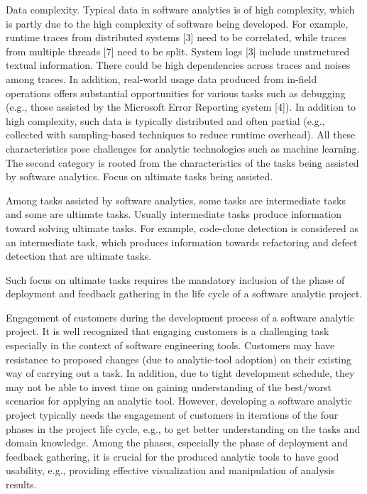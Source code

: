 Data complexity. 
Typical data in software analytics is of high complexity, which is partly due to the high complexity of software being developed. For example, runtime traces from distributed systems [3] need to be correlated, while traces from multiple threads [7] need to be split. System logs [3] include unstructured textual information. There could be high dependencies across traces and noises among traces. In addition, real-world usage data produced from in-field operations offers substantial opportunities for various tasks such as debugging (e.g., those assisted by the Microsoft Error Reporting system [4]). In addition to high complexity, such data is typically distributed and often partial (e.g., collected with sampling-based techniques to reduce runtime overhead). All these characteristics pose challenges for analytic technologies such as machine learning. The second category is rooted from the characteristics of the
tasks being assisted by software analytics. Focus on ultimate tasks being assisted. 

Among tasks assisted by software analytics, some tasks are intermediate tasks and some are ultimate tasks. Usually intermediate tasks produce information toward solving ultimate tasks. For example, code-clone detection is considered as an intermediate task, which produces information towards refactoring and defect detection that are ultimate tasks.

Such focus on ultimate tasks requires the mandatory inclusion of the phase of deployment and feedback gathering in the life cycle of a software analytic project. 

Engagement of customers during the development process of a software analytic project. It is well recognized that engaging customers is a challenging task especially in the context of software engineering tools. Customers may have resistance to proposed changes (due to analytic-tool adoption) on their existing way of carrying out a task. In addition, due to tight development schedule, they may not be able to invest time on gaining understanding of the best/worst scenarios for applying an analytic tool. However, developing a software analytic project typically needs the engagement of customers in iterations of the four phases in the project life cycle, e.g., to get better understanding on the tasks and domain knowledge. Among the phases, especially the phase of deployment and feedback gathering, it is crucial for the produced analytic tools to have good usability, e.g., providing effective visualization and manipulation of analysis results.